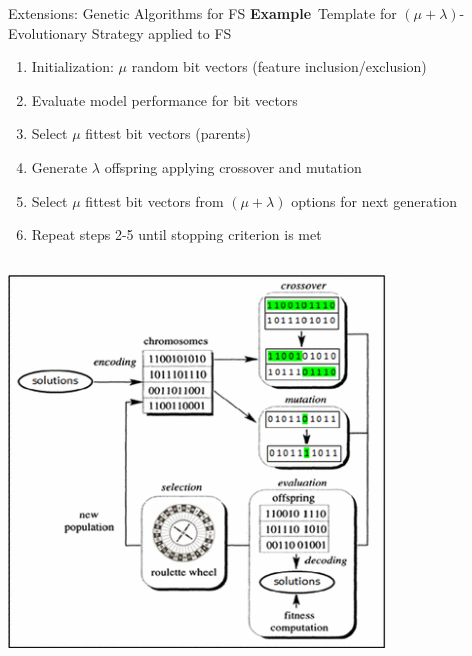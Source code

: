 \documentclass[11pt,compress,t,notes=noshow, xcolor=table]{beamer}
\begin{document}
\begin{vbframe}{Extensions: Genetic Algorithms for FS}
    \textbf{Example}\, Template for $(\mu+\lambda)$-Evolutionary Strategy applied to FS
\begin{enumerate}
    \item Initialization: $\mu$ random bit vectors (feature inclusion/exclusion)
    \item Evaluate model performance for bit vectors
    \item Select $\mu$ fittest bit vectors (parents)
    \item Generate $\lambda$ offspring applying crossover and mutation
    \item Select $\mu$ fittest bit vectors from $(\mu+\lambda)$ options for next generation
    \item Repeat steps 2-5 until stopping criterion is met
\end{enumerate}
\begin{columns}[c]
    \begin{column}{0.5\textwidth}
            \hspace{1cm}
            \includegraphics[width = 0.75\textwidth]{figure/genetic-alg.png}

\end{column}
\end{columns}
\end{vbframe}
\end{document}

